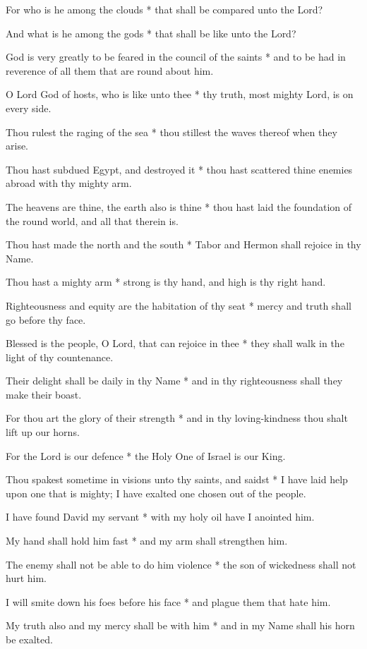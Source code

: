For who is he among the clouds * that shall be compared unto the Lord?

And what is he among the gods * that shall be like unto the Lord?

God is very greatly to be feared in the council of the saints * and to be had in reverence of all them that are round about him.

O Lord God of hosts, who is like unto thee * thy truth, most mighty Lord, is on every side.

Thou rulest the raging of the sea * thou stillest the waves thereof when they arise.

Thou hast subdued Egypt, and destroyed it * thou hast scattered thine enemies abroad with thy mighty arm.

The heavens are thine, the earth also is thine * thou hast laid the foundation of the round world, and all that therein is.

Thou hast made the north and the south * Tabor and Hermon shall rejoice in thy Name.

Thou hast a mighty arm * strong is thy hand, and high is thy right hand.

Righteousness and equity are the habitation of thy seat * mercy and truth shall go before thy face.

Blessed is the people, O Lord, that can rejoice in thee * they shall walk in the light of thy countenance.

Their delight shall be daily in thy Name * and in thy righteousness shall they make their boast.

For thou art the glory of their strength * and in thy loving-kindness thou shalt lift up our horns.

For the Lord is our defence * the Holy One of Israel is our King.

Thou spakest sometime in visions unto thy saints, and saidst * I have laid help upon one that is mighty; I have exalted one chosen out of the people.

I have found David my servant * with my holy oil have I anointed him.

My hand shall hold him fast * and my arm shall strengthen him.

The enemy shall not be able to do him violence * the son of wickedness shall not hurt him.

I will smite down his foes before his face * and plague them that hate him.

My truth also and my mercy shall be with him * and in my Name shall his horn be exalted.

